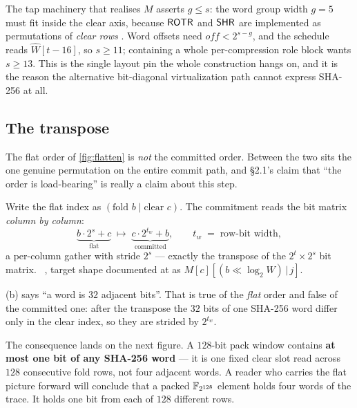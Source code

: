 \begin{remark}\label{rem:layout}
The tap machinery that realises $M$ asserts $g\leq s$: the word group width
$g=5$ must fit inside the clear axis, because $\mathsf{ROTR}$ and $\mathsf{SHR}$ are
implemented as permutations of \emph{clear rows}
. Word offsets need $\mathit{off}<2^{s-g}$, and the schedule
reads $\hat W[t{-}16]$, so $s\geq11$; containing a whole per-compression role
block wants $s\geq13$. This is the single layout pin the whole construction
hangs on, and it is the reason the alternative bit-diagonal virtualization path
cannot express SHA-256 at all.
\end{remark}

\subsection{The transpose}\label{sec:committedorder}

The flat order of \cref{fig:flatten} is \emph{not} the committed order. Between
the two sits the one genuine permutation on the entire commit path, and \S2.1's
claim that ``the order is load-bearing'' is really a claim about this step.

Write the flat index as $(\text{fold }b \mid \text{clear }c)$. The commitment
reads the bit matrix \emph{column by column}:
\[
  \underbrace{b\cdot 2^{s} + c}_{\text{flat}}
  \;\longmapsto\;
  \underbrace{c\cdot 2^{t_w} + b}_{\text{committed}},
  \qquad t_w \;=\; \text{row-bit width},
\]
a per-column gather with stride $2^{s}$ --- exactly the transpose of the
$2^{t}\times2^{s}$ bit matrix. ~,
target shape documented at  as
$M[c][(b\ll\log_2 W)\,|\,j]$.

\begin{warning}
\label{warn:transpose}
(b) says ``a word is $32$ adjacent bits''. That is true of the
\emph{flat} order and false of the committed one: after the transpose the $32$
bits of one SHA-256 word differ only in the clear index, so they are strided by
$2^{t_w}$.

The consequence lands on the next figure. A $128$-bit pack window contains
\textbf{at most one bit of any SHA-256 word} --- it is one fixed clear slot read
across $128$ consecutive fold rows, not four adjacent words. A reader who
carries the flat picture forward will conclude that a packed
$\mathbb{F}_{2^{128}}$ element holds four words of the trace. It holds one bit from each of
$128$ different rows.
\end{warning}

